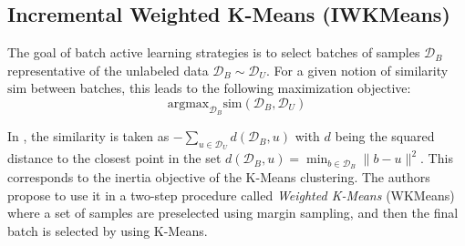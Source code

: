 \documentclass[runningheads]{llncs}
\newcommand{\B}[1]{\mathbf{#1}}
\newcommand{\C}[1]{\mathcal{#1}}
\DeclareMathOperator*{\argmin}{arg\,min}
\DeclareMathOperator*{\argmax}{arg\,max}
\begin{document}



\subsection{Incremental Weighted K-Means (IWKMeans)}

The goal of batch active learning strategies is to select batches of samples 
$\C{D}_B$ representative of the unlabeled data $\C{D}_B \sim \C{D}_U$. For a given notion of 
similarity $\text{sim}$ between batches, this leads to the following maximization objective:
\begin{equation}
  \label{eq:sim}
\text{argmax}_{\C{D}_B} \text{sim}(\C{D}_B, \C{D}_U)
\end{equation}

In \cite{zhdanov2019diverse}, the similarity is taken as $- \sum_{u \in \C{D}_U} d(\C{D}_B, u)$ with $d$ being the squared distance to the closest
point in the set $d(\C{D}_B, u) = \min_{b \in \C{D}_B} \|b - u\|^2$. This corresponds to the inertia objective of the K-Means clustering.
The authors propose to use it in a two-step procedure called \emph{Weighted K-Means} (WKMeans)
where a set of samples are preselected using margin sampling, and then the final batch is selected by using
K-Means.
\end{document}
